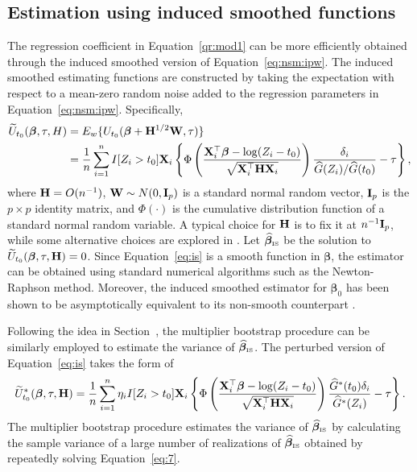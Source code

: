 \subsection{Estimation using induced smoothed functions} \label{sec:IS:pt}

The regression coefficient in Equation~\eqref{qr:mod1} can be more efficiently obtained 
through the induced smoothed version of Equation~\eqref{eq:nsm:ipw}. 
The induced smoothed estimating functions are constructed by taking 
the expectation with respect to a mean-zero random noise added to the 
regression parameters in Equation~\eqref{eq:nsm:ipw}.
Specifically, 
\begin{align}\label{eq:is}
  \widetilde{U}_{t_0}(\bm{\beta}, \tau, H) & = E_w \{U_{t_0}(\bm{\beta}+\mathbf{H}^{1/2}\mathbf{W}, \tau)\}\nonumber\\
                                           & = \frac{1}{n} \sum_{i=1}^{n} I[Z_i > t_0] \mathbf{X}_i \left\{ \Phi\left(\frac{\mathbf{X}_i^\top\bm{\beta}-\log(Z_i-t_0)}{\sqrt{\mathbf{X}_i^{\top} \mathbf{H} \mathbf{X}_{i}}}\right)\frac{\delta_i}{\widehat{G}(Z_i)/\widehat{G}(t_0) }  -\tau \right\},
\end{align}
where $\mathbf{H} = O(n^{-1})$,
$\mathbf{W} \sim N(0, \mathbf{I}_p)$ is a standard normal random vector, 
$\mathbf{I}_p$ is the $p \times p $ identity matrix,
and $\Phi(\cdot)$ is the cumulative distribution function of a standard normal random variable. 
A typical choice for $\mathbf{H}$ is to fix it at $n^{-1}\mathbf{I}_p$, 
while some alternative choices are explored in \citet{chiou2015rank}.
Let $\widehat{\bm{\beta}}_{\tiny\mbox{IS}}$ be the solution to $\widetilde{U}_{t_0}(\bm{\beta}, \tau, \mathbf{H}) = 0$. 
Since Equation~\eqref{eq:is} is a smooth function in $\bm{\beta}$, 
the estimator can be obtained using standard numerical algorithms such as the Newton-Raphson method. 
Moreover, the induced smoothed estimator for $\bm{\beta}_0$ has been shown to be 
asymptotically equivalent to its non-smooth counterpart \citep{kim2023smoothed}.


Following the idea in Section~, 
the multiplier bootstrap procedure can be similarly employed to estimate the variance of $\widehat{\bm{\beta}}_{\tiny\mbox{IS}}$. 
The perturbed version of Equation~\eqref{eq:is} takes the form of 
\begin{equation} \label{eq:7}
  \widetilde{U}^{\ast}_{t_0}(\bm{\beta}, \tau, \mathbf{H}) = \frac{1}{n} \sum_{i=1}^{n} \eta_i I[Z_i > t_0] \mathbf{X}_i  \left\{ \Phi\left(\frac{\mathbf{X}_i^\top\bm{\beta} - \log(Z_i-t_0)}{\sqrt{\mathbf{X}_i^{\top} \mathbf{H} \mathbf{X}_{i}}}\right)\frac{\widehat{G}^{\ast}(t_0) \delta_i}{\widehat{G}^{\ast}(Z_i)} -\tau \right\}.
\end{equation}
The multiplier bootstrap procedure estimates the variance of $\widehat{\bm{\beta}}_{\tiny\mbox{IS}}$ by calculating the sample variance of
a large number of realizations of $\widehat{\bm{\beta}}_{\tiny\mbox{IS}}$ obtained by repeatedly solving Equation~\eqref{eq:7}. 


